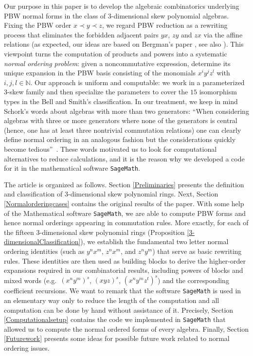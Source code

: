 \documentclass{amsart}
\theoremstyle{definition}
\theoremstyle{remark}
\numberwithin{equation}{section}
\begin{document}
Our purpose in this paper is to develop the algebraic combinatorics underlying PBW normal forms in the class of $3$-dimensional skew polynomial algebras. Fixing the PBW order $x\prec y\prec z$, we regard PBW reduction as a rewriting process that eliminates the forbidden adjacent pairs $yx$, $zy$ and $zx$ via the affine relations (as expected, our ideas are based on Bergman's paper \cite{Bergman1978}, see also \cite{ReyesSuarez20173D}). This viewpoint turns the computation of products and powers into a systematic \emph{normal ordering problem}: given a noncommutative expression, determine its unique expansion in the PBW basis consisting of the monomials $x^i y^j z^{l}$ with $i, j, l \in \mathbb{N}$. Our approach is uniform and computable: we work in a parameterized $3$-skew family and then specialize the parameters to cover the $15$ isomorphism types in the Bell and Smith's classification. In our treatment, we keep in mind Schork's words about algebras with more than two generators: \textquotedblleft When considering algebras with three or more generators where none of the generators is central (hence, one has at least three nontrivial commutation relations) one can clearly define normal ordering in an analogous fashion but the considerations quickly become tedious\textquotedblright\ \cite[p. 4]{Schork2021}. These words motivated us to look for computational alternatives to reduce calculations, and it is the reason why we developed a code for it in the mathematical software \texttt{SageMath}.

The article is organized as follows. Section \ref{Preliminaries} presents the definition and classification of 3-dimensional skew polynomial rings. Next, Section \ref{Normalorderingcases} contains the original results of the paper. With some help of the Mathematical software \texttt{SageMath}, we are able to compute PBW forms and hence normal orderings appearing in commutation rules. More exactly, for each of the fifteen 3-dimensional skew polynomial rings (Proposition \ref{3-dimensionalClassification}), we establish the fundamental two letter normal ordering identities (such as $y^n x^m$, $z^n x^m$, and $z^n y^m$) that serve as basic rewriting rules. These identities are then used as building blocks to derive the higher-order expansions required in our combinatorial results, including powers of blocks and mixed words (e.g.\ $(x^n y^m)^s$, $(xyz)^s$, $(x^n y^m z^t)^s$) and the corresponding coefficient recursions. We want to remark that the software \texttt{SageMath} is used in an elementary way only to reduce the
length of the computation and all computation can be done by hand without assistance of it. Precisely, Section \ref{Computationalsetup} contains the code we implemented in \texttt{SageMath} that allowed us to compute the normal ordered forms of every algebra. Finally, Section \ref{Futurework} presents some ideas for possible future work related to normal ordering issues.
\end{document}
